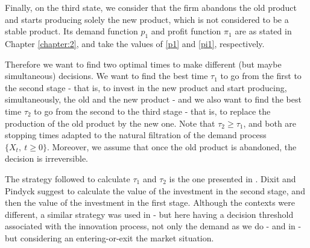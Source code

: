


Finally, on the third state, we consider that the firm abandons the old product and starts producing solely the new product, which is not considered to be a stable product. Its demand function $p_1$ and profit function $\pi_1$ are as stated in Chapter \ref{chapter:2}, and take the values of \eqref{p1} and \eqref{pi1}, respectively.


Therefore we want to find two optimal times to make different (but maybe simultaneous) decisions. We want to find the best time $\tau_1$ to go from the first to the second stage - that is, to invest in the new product and start producing, simultaneously, the old and the new product - and we also want to find the best time $\tau_2$ to go from the second to the third stage - that is, to replace the production of the old product by the new one. Note that $\tau_2 \geq \tau_1$, and both are stopping times adapted to the natural filtration of the demand process $\{ X_t, \ t\geq0 \}$. Moreover, we assume that once the old product is abandoned, the decision is irreversible.

The strategy followed to calculate $\tau_1$ and $\tau_2$ is the one presented in \cite{dixit:book}. Dixit and Pindyck suggest to
calculate the value of the investment in the second stage, and then the value of the investment in the first stage. Although the contexts were different, a similar strategy was used in \cite{rita} - but here having a decision threshold associated with the innovation process, not only the demand as we do - and in \cite{hagspiel:cap} - but considering an entering-or-exit the market situation.

